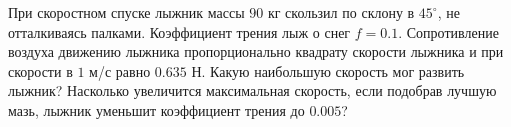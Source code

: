 При скоростном спуске лыжник массы $90$ кг скользил по склону в
$45^{\circ}$, не отталкиваясь палками. Коэффициент трения лыж о снег
$f=0.1$. Сопротивление воздуха движению лыжника пропорционально квадрату
скорости лыжника и при скорости в $1$ м/с равно $0.635$ Н. Какую
наибольшую скорость мог развить лыжник? Насколько увеличится
максимальная скорость, если подобрав лучшую мазь, лыжник уменьшит
коэффициент трения до $0.005$?
